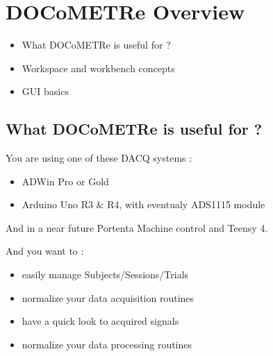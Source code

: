 \documentclass[a4paper,11pt]{beamer}
\begin{document}
\section{DOCoMETRe Overview}
\begin{frame}
\begin{itemize}
    \item What DOCoMETRe is useful for ?
    \item Workspace and workbench concepts
    \item GUI basics
\end{itemize}

\end{frame}


\subsection{What DOCoMETRe is useful for ?}
\begin{frame}
\begin{exampleblock}{You are using one of these DACQ systems :}
    \begin{itemize}
        \item ADWin Pro or Gold
        \item Arduino Uno R3 \& R4, with eventualy ADS1115 module
    \end{itemize}
\centering
And in a near future Portenta Machine control and Teensy 4.
\end{exampleblock}

\begin{exampleblock}{And you want to :}
    \begin{itemize}
        \item easily manage Subjects/Sessions/Trials
        \item normalize your data acquisition routines
        \item have a quick look to acquired signals
        \item normalize your data processing routines
    \end{itemize}
\end{exampleblock}
\end{frame}
\end{document}
